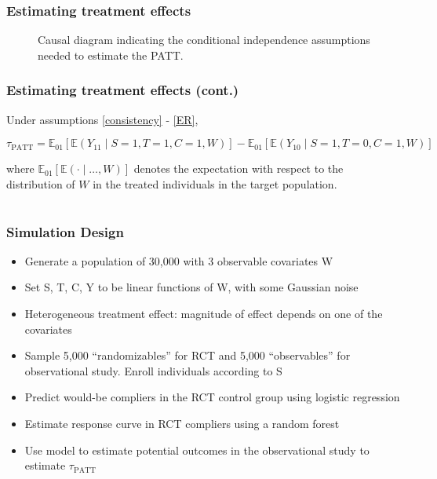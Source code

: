 \documentclass{beamer}
\newcommand{\ex}{\mathbb{E}} %
\begin{document}
\begin{frame}
\frametitle{Estimating treatment effects}
\begin{figure}[h]
\caption{Causal diagram indicating the conditional independence assumptions needed to estimate the PATT.}\label{fig:DAG}
\end{figure}

\end{frame}


\begin{frame}
\frametitle{Estimating treatment effects (cont.)}
\begin{theorem}\label{thm1}
\fontsize{9pt}{7.2}\selectfont
Under assumptions \eqref{consistency} - \eqref{ER},

$$\tau_{\text{PATT}} = \ex_{01}\left[  \ex\left(Y_{11} \mid S=1, T=1, C=1, W\right)\right]
-\ex_{01}\left[  \ex\left(Y_{10} \mid S=1, T=0, C=1, W\right) \right] $$

where $\ex_{01}\left[\ex(\cdot \mid\dots, W)\right]$ denotes the expectation with respect to the distribution of $W$ in the treated individuals in the target population.  
\end{theorem}
\end{frame}


\section[Simulation]{}


\begin{frame}
\frametitle{Simulation Design}
\begin{itemize}
\item Generate a population of 30,000 with 3 observable covariates W
\item Set S, T, C, Y to be linear functions of W, with some Gaussian noise
\item Heterogeneous treatment effect: magnitude of effect depends on one of the covariates
\item Sample 5,000 ``randomizables'' for RCT and 5,000 ``observables'' for observational study. Enroll individuals according to S
\item Predict would-be compliers in the RCT control group using logistic regression
\item Estimate response curve in RCT compliers using a random forest
\item Use model to estimate potential outcomes in the observational study to estimate $\tau_{\text{PATT}}$
\end{itemize}
\end{frame}
\end{document}
